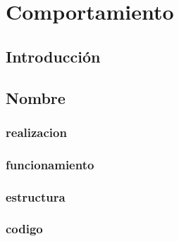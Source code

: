 \chapter{Comportamiento}
\section{Introducción}
\newpage
\section{Nombre}
\subsection{realizacion}
\newpage
\subsection{funcionamiento}
\newpage
\subsection{estructura}
\newpage
\subsection{codigo}
\newpage